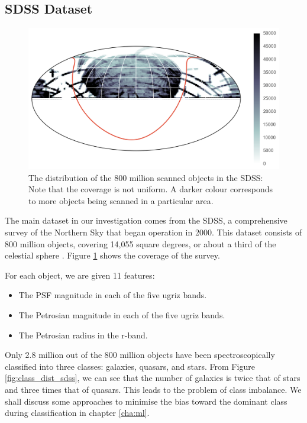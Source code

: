 \subsection{SDSS Dataset} 
\label{sub:sdss}

\begin{figure}[tbp]
	\centering
	\includegraphics[width=\textwidth]{figures/4_expt1/map_prediction_forest_all}
	\caption[Coverage of the SDSS]{The distribution of the 800 million scanned objects
		in the SDSS: Note that the coverage is not uniform. A darker colour
		corresponds to more objects being scanned in a particular area.}
	\label{fig:coverage}
\end{figure}

The main dataset in our investigation comes from the SDSS, a comprehensive survey of the
Northern Sky that began operation in 2000. This dataset consists of 800 million objects, covering
14,055 square degrees, or 
about a third of the celestial sphere \cite{alam15}. Figure \ref{fig:coverage} shows the coverage of the survey.

For each object, we are given 11 features:
	\begin{itemize}
		\item The PSF magnitude in each of the five ugriz bands.
		\item The Petrosian magnitude in each of the five ugriz bands.
		\item The Petrosian radius in the r-band.
	\end{itemize}
Only 2.8 million out of the 800 million objects have been spectroscopically classified into three
classes: galaxies, quasars, and stars. From Figure \ref{fig:class_dist_sdss}, we can see that the
number of galaxies is twice that of stars and three times that of quasars. This leads to
the problem of class imbalance. We shall discuss some approaches to minimise the bias toward
the dominant class during classification in chapter \ref{cha:ml}.

